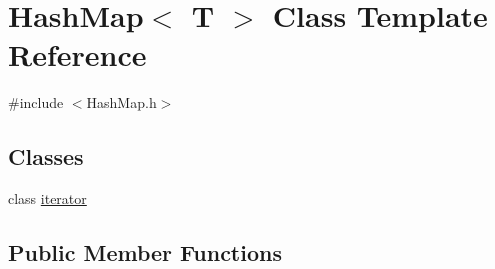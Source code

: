 \hypertarget{class_hash_map}{}\section{Hash\+Map$<$ T $>$ Class Template Reference}
\label{class_hash_map}


{\ttfamily \#include $<$Hash\+Map.\+h$>$}

\subsection*{Classes}
\begin{DoxyCompactItemize}
\item 
class \hyperlink{class_hash_map_1_1iterator}{iterator}
\end{DoxyCompactItemize}
\subsection*{Public Member Functions}
